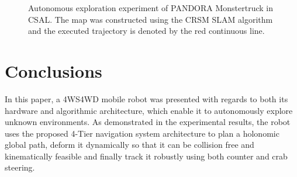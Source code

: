 \documentclass[conference]{IEEEtran}
\begin{document}
\begin{figure}[!ht]
	\centering
	\caption{Autonomous exploration experiment of PANDORA Monstertruck in CSAL. The map was constructed using the CRSM SLAM algorithm and the executed trajectory is denoted by the red continuous line.}
	\label{fig:exploration_exp}
\end{figure}


\section{Conclusions} \label{sec:conclusions}

In this paper, a 4WS4WD mobile robot was presented with regards to both its hardware and algorithmic architecture, which enable it to autonomously explore unknown environments. As demonstrated in the experimental results, the robot uses the proposed 4-Tier navigation system architecture to plan a holonomic global path, deform it dynamically so that it can be collision free and kinematically feasible and finally track it robustly using both counter and crab steering.
\end{document}
